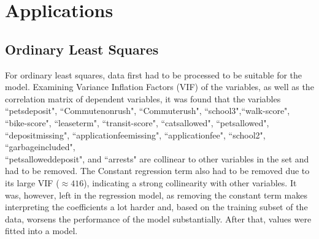 \documentclass[12pt]{report}
\begin{document}
\section{Applications}
\subsection{Ordinary Least Squares}
For ordinary least squares, data first had to be processed to be suitable for the model. Examining Variance Inflation Factors (VIF) of the variables, as well as the correlation matrix of dependent variables, it was found that the variables ``pets\textunderscore deposit", ``Commute\textunderscore nonrush", ``Commute\textunderscore rush", ``school3",``walk-score", ``bike-score", ``lease\textunderscore term", ``transit-score", ``cats\textunderscore allowed", ``pets\textunderscore allowed", ``deposit\textunderscore missing", ``application\textunderscore fee\textunderscore missing", ``application\textunderscore fee", ``school2", ``garbageincluded", \\ ``pets\textunderscore allowed\textunderscore deposit", and ``arrests" are collinear to other variables in the set and had to be removed. The Constant regression term also had to be removed due to its large VIF ($\approx416$), indicating a strong collinearity with other variables. It was, however, left in the regression model, as removing the constant term makes interpreting the coefficients a lot harder and, based on the training subset of the data, worsens the performance of the model substantially. After that, values were fitted into a model.
\end{document}

